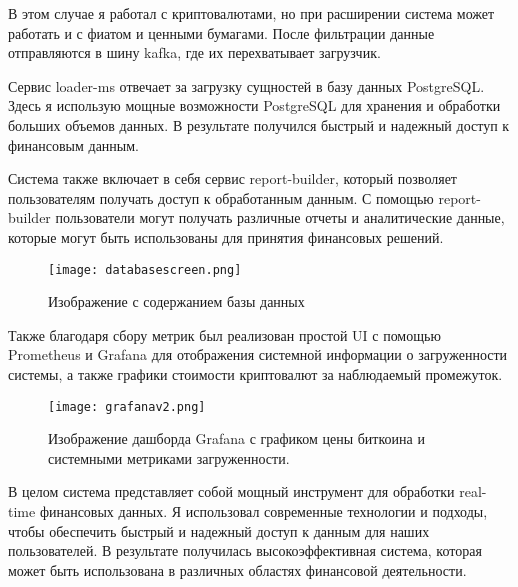В этом случае я работал с криптовалютами, но при расширении система может
работать и с фиатом и ценными бумагами. После фильтрации данные
отправляются в шину kafka, где их перехватывает загрузчик.

Сервис loader-ms отвечает за загрузку сущностей в базу данных PostgreSQL. Здесь
я использую мощные возможности PostgreSQL для хранения и обработки больших
объемов данных. В результате получился быстрый и надежный доступ к финансовым
данным.

Система также включает в себя сервис report-builder, который позволяет
пользователям получать доступ к обработанным данным. С помощью report-builder
пользователи могут получать различные отчеты и аналитические данные, которые
могут быть использованы для принятия финансовых решений.

\begin{figure}[h]
    \centering
    \texttt{[image: databasescreen.png]}
    \caption{Изображение с содержанием базы данных }
\end{figure}

Также благодаря сбору метрик был реализован простой UI с помощью Prometheus и Grafana
для отображения системной информации о загруженности системы, а также графики
стоимости криптовалют за наблюдаемый промежуток.

\begin{landscape}
    \begin{figure}[!h]
        \centering
        \texttt{[image: grafanav2.png]}
        \caption{Изображение дашборда Grafana с графиком цены биткоина и системными метриками загруженности.}
        \label{grafana}
    \end{figure}
\end{landscape}

В целом система представляет собой мощный инструмент для обработки
real-time финансовых данных. Я использовал современные технологии и подходы,
чтобы обеспечить быстрый и надежный доступ к данным для наших пользователей. В
результате получилась высокоэффективная система, которая может быть
использована в различных областях финансовой деятельности.
